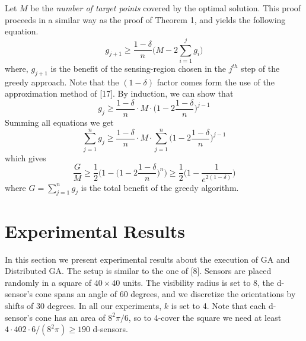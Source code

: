 \documentclass[conference]{IEEEtran}
\newenvironment{proof_}{{\indent \indent \it Proof:}}{\hfill $\blacksquare$\par}
\theoremstyle{definition}
\newtheorem*{NP-Hardness of Approximating the SODkC Problem}{NP-Hardness of Approximating the SODkC Problem}
\newtheorem*{Greedy Algorithm (GA)}{Greedy Algorithm (GA)}
\newtheorem*{GA on the Running Example}{GA on the Running Example}
\newtheorem*{Performance Guarantee of GA}{Performance Guarantee of GA}
\begin{document}
\begin{proof_}
Let $M$ be the \textit{number of target points} covered by the optimal solution. This proof proceeds in a similar way as the proof of Theorem 1, and yields the following equation.
\begin{equation*}
    g_{j+1} \geq \frac{1-\delta}{n} \Bigg( M - 2 \sum_{i=1}^j g_i \Bigg)
\end{equation*}
where, $g_{j+1}$ is the benefit of the sensing-region chosen in the $j^{th}$ step of the greedy approach. Note that the $(1 - \delta)$ factor comes form the use of the approximation method of [17]. By induction, we can show that
\begin{equation*}
g_j \geq \frac{1-\delta}{n} \cdot M \cdot \bigg( 1-2\frac{1-\delta}{n} \bigg)^{j-1}
\end{equation*}
Summing all equations we get
\begin{equation*}
    \sum_{j=1}^n g_j \geq \frac{1-\delta}{n} \cdot M \cdot \sum_{j=1}^n \bigg( 1-2\frac{1-\delta}{n} \bigg)^{j-1}
\end{equation*}
which gives
\begin{equation*}
    \frac{G}{M} \geq \frac{1}{2} \bigg(1-\bigg( 1-2\frac{1-\delta}{n} \bigg)^n \bigg) \geq \frac{1}{2}\bigg( 1-\frac{1}{e^{2(1-\delta)}} \bigg)
\end{equation*}
where $G = \sum_{j=1}^n g_j$ is the total benefit of the greedy algorithm.
\end{proof_}

\section{Experimental Results}
In this section we present experimental results about the execution of GA and Distributed GA. The setup is similar to the one of [8]. Sensors are placed randomly in a square of $40 \times 40$ units. The visibility radius is set to 8, the d-sensor’s cone spans an angle of 60 degrees, and we discretize the orientations by shifts of 30 degrees. In all our experiments, $k$ is set to 4. Note that each d-sensor’s cone has an area of $8^2\pi/6$, so to 4-cover the square we need at least $4 \cdot 402 \cdot 6/(8^2\pi) \geq 190$ d-sensors.
\end{document}

